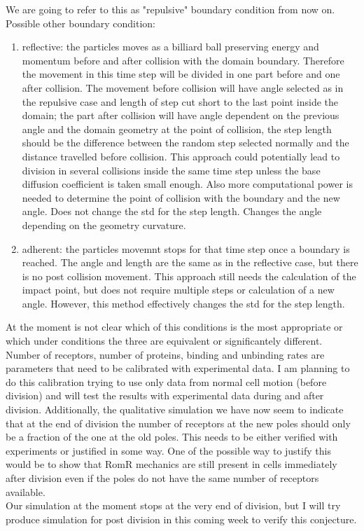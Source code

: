 \documentclass[12pt]{article}
\begin{document}
We are going to refer to this as "repulsive" boundary condition from now on.\\
Possible other boundary condition:\\
\begin{enumerate}
\item reflective: the particles moves as a billiard ball preserving energy and momentum before and after collision with the domain boundary. Therefore the movement in this time step will be divided in one part before and one after collision. The movement before collision will have angle selected as in the repulsive case and length of step cut short to the last point inside the domain; the part after collision will have angle dependent on the previous angle and the domain geometry at the point of collision, the step length should be the difference between the random step selected normally and the distance travelled before collision. This approach could potentially lead to division in several collisions inside the same time step unless the base diffusion coefficient is taken small enough. Also more computational power is needed to determine the point of collision with the boundary and the new angle. Does not change the std for the step length. Changes the angle depending on the geometry curvature.\\
\item adherent: the particles movemnt stops for that time step once a boundary is reached. The angle and length are the same as in the reflective case, but there is no post collision movement. This approach still needs the calculation of the impact point, but does not require multiple steps or calculation of a new angle. However, this method effectively changes the std for the step length.
\end{enumerate}

At the moment is not clear which of this conditions is the most appropriate or which under conditions the three are equivalent or significantely different.\\
   

Number of receptors, number of proteins, binding and unbinding rates are parameters that need to be calibrated with experimental data. I am planning to do this calibration trying to use only data from normal cell motion (before division) and will test the results with experimental data during and after division. Additionally, the qualitative simulation we have now seem to indicate that at the end of division the number of receptors at the new poles should only be a fraction of the one at the old poles. This needs to be either verified with experiments or justified in some way. One of the possible way to justify this would be to show that RomR mechanics are still present in cells immediately after division even if the poles do not have the same number of receptors available.\\
Our simulation at the moment stops at the very end of division, but I will try produce simulation for post division in this coming week to verify this conjecture.
\end{document}
